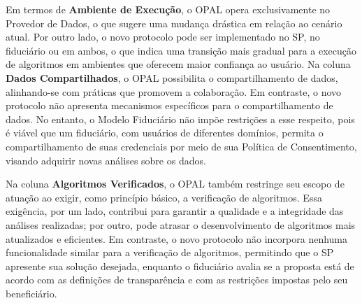 Em termos de \textbf{Ambiente de Execução}, o \acs{OPAL} opera exclusivamente no Provedor de Dados, o que sugere uma mudança drástica em relação ao cenário atual. Por outro lado, o novo protocolo pode ser implementado no SP, no fiduciário ou em ambos, o que indica uma transição mais gradual para a execução de algoritmos em ambientes que oferecem maior confiança ao usuário. Na coluna \textbf{Dados Compartilhados}, o \acs{OPAL} possibilita o compartilhamento de dados, alinhando-se com práticas que promovem a colaboração. Em contraste, o novo protocolo não apresenta mecanismos específicos para o compartilhamento de dados. No entanto, o Modelo Fiduciário não impõe restrições a esse respeito, pois é viável que um fiduciário, com usuários de diferentes domínios, permita o compartilhamento de suas credenciais por meio de sua Política de Consentimento, visando adquirir novas análises sobre os dados.

Na coluna \textbf{Algoritmos Verificados}, o \acs{OPAL} também restringe seu escopo de atuação ao exigir, como princípio básico, a verificação de algoritmos. Essa exigência, por um lado, contribui para garantir a qualidade e a integridade das análises realizadas; por outro, pode atrasar o desenvolvimento de algoritmos mais atualizados e eficientes. Em contraste, o novo protocolo não incorpora nenhuma funcionalidade similar para a verificação de algoritmos, permitindo que o \acs{SP} apresente sua solução desejada, enquanto o fiduciário avalia se a proposta está de acordo com as definições de transparência e com as restrições impostas pelo seu beneficiário.




